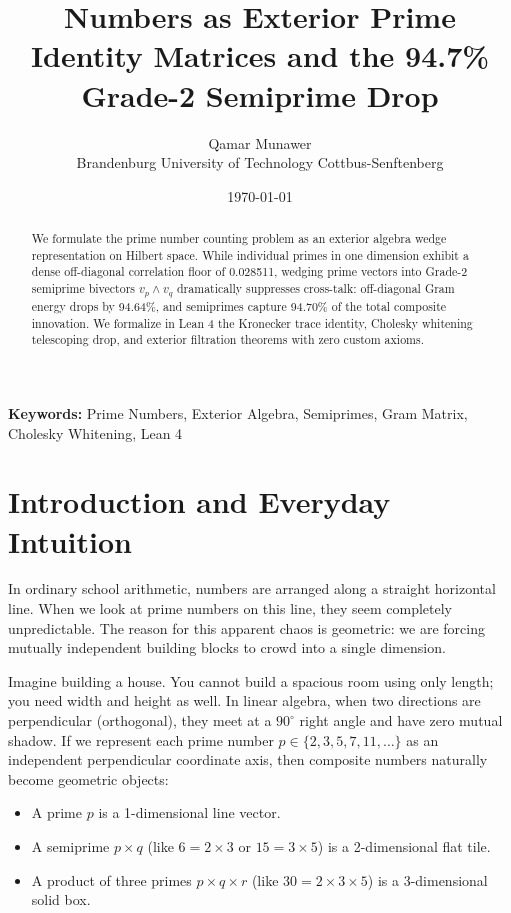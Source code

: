 \documentclass[11pt,a4paper]{article}
\title{\textbf{Numbers as Exterior Prime Identity Matrices and the 94.7\% Grade-2 Semiprime Drop}}
\author{Qamar Munawer \\ Brandenburg University of Technology Cottbus-Senftenberg}
\date{\today}
\theoremstyle{definition}
\begin{document}
\maketitle

\begin{abstract}
We formulate the prime number counting problem as an exterior algebra wedge representation on Hilbert space. While individual primes in one dimension exhibit a dense off-diagonal correlation floor of 0.028511, wedging prime vectors into Grade-2 semiprime bivectors $v_p \wedge v_q$ dramatically suppresses cross-talk: off-diagonal Gram energy drops by 94.64\%, and semiprimes capture 94.70\% of the total composite innovation. We formalize in Lean 4 the Kronecker trace identity, Cholesky whitening telescoping drop, and exterior filtration theorems with zero custom axioms.
\end{abstract}

\vspace{1em}
\noindent\textbf{Keywords:} Prime Numbers, Exterior Algebra, Semiprimes, Gram Matrix, Cholesky Whitening, Lean 4

\section{Introduction and Everyday Intuition}

In ordinary school arithmetic, numbers are arranged along a straight horizontal line. When we look at prime numbers on this line, they seem completely unpredictable. The reason for this apparent chaos is geometric: we are forcing mutually independent building blocks to crowd into a single dimension.

Imagine building a house. You cannot build a spacious room using only length; you need width and height as well. In linear algebra, when two directions are perpendicular (orthogonal), they meet at a $90^\circ$ right angle and have zero mutual shadow. If we represent each prime number $p \in \{2, 3, 5, 7, 11, \dots\}$ as an independent perpendicular coordinate axis, then composite numbers naturally become geometric objects:
\begin{itemize}
\item A prime $p$ is a 1-dimensional line vector.
\item A semiprime $p \times q$ (like $6 = 2 \times 3$ or $15 = 3 \times 5$) is a 2-dimensional flat tile.
\item A product of three primes $p \times q \times r$ (like $30 = 2 \times 3 \times 5$) is a 3-dimensional solid box.
\end{itemize}
\end{document}
